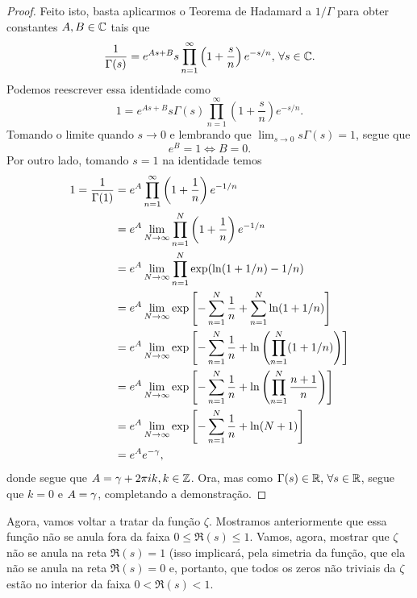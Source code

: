 \begin{proof}
        Feito isto, basta aplicarmos o Teorema de Hadamard a $1/\Gamma$ para obter constantes
        $A,B\in\mathbb{C}$ tais que
        \[
        \frac{1}{\Gamma(s)} = e^{As + B}s\prod_{n=1}^{\infty} \left(1 + \frac{s}{n}\right)e^{-s/n}, \,
        \forall s\in\mathbb{C}.
        \]
        Podemos reescrever essa identidade como
        \[
        1 = e^{As + B}s\Gamma(s)\prod_{n=1}^{\infty} \left(1 + \frac{s}{n}\right)e^{-s/n}.
        \]
        Tomando o limite quando $s\to 0$ e lembrando que $\lim_{s\to 0}s\Gamma(s) = 1$, segue que
        \[
        e^B = 1 \iff B = 0.
        \]
        Por outro lado, tomando $s=1$ na identidade temos
        \begin{align*}
            1 = \frac{1}{\Gamma(1)} &= e^A \prod_{n=1}^{\infty} \left(1 + \frac{1}{n}\right)e^{-1/n} \\
                                &= e^A \lim_{N\to\infty}\prod_{n=1}^{N} \left(1 + \frac{1}{n}\right)e^{-1/n} \\
                                &= e^A \lim_{N\to\infty}\prod_{n=1}^{N} \exp(\ln(1+1/n) - 1/n) \\
                                &= e^A \lim_{N\to\infty} \exp\left[ -\sum_{n=1}^N \frac{1}{n} +
                                                \sum_{n=1}^N \ln(1 + 1/n) \right] \\
                                &= e^A \lim_{N\to\infty} \exp\left[ -\sum_{n=1}^N \frac{1}{n} +
                                                \ln\left( \prod_{n=1}^N (1 + 1/n) \right) \right] \\
                                &= e^A \lim_{N\to\infty} \exp\left[ -\sum_{n=1}^N \frac{1}{n} +
                                                \ln\left( \prod_{n=1}^N \frac{n+1}{n} \right) \right] \\
                                &= e^A \lim_{N\to\infty} \exp\left[ -\sum_{n=1}^N \frac{1}{n} +
                                                \ln(N+1) \right] \\
                                &= e^Ae^{-\gamma},
        \end{align*}
        donde segue que $A = \gamma + 2\pi ik, k\in\mathbb{Z}$. Ora, mas como $\Gamma(s)\in\mathbb{R}, \, \forall s\in\mathbb{R}$,
        segue que $k = 0$ e $A = \gamma$, completando a demonstração.
    \end{proof}
    Agora, vamos voltar a tratar da função $\zeta$. Mostramos
    anteriormente que essa função não se anula fora da faixa
    $0 \leq \Re(s) \leq 1$. Vamos, agora, mostrar que
    $\zeta$ não se anula na reta $\Re(s) = 1$ (isso implicará,
    pela simetria da função, que ela não se anula na reta 
    $\Re(s) = 0$ e, portanto, que todos os zeros não triviais
    da $\zeta$ estão no interior da faixa $0<\Re(s)<1$.
    
